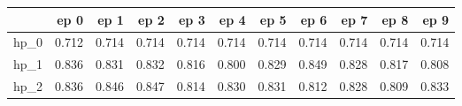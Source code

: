 \begin{tabular}{lrrrrrrrrrr}
\toprule
{} &   ep 0 &   ep 1 &   ep 2 &   ep 3 &   ep 4 &   ep 5 &   ep 6 &   ep 7 &   ep 8 &   ep 9 \\
\midrule
hp\_0 &  0.712 &  0.714 &  0.714 &  0.714 &  0.714 &  0.714 &  0.714 &  0.714 &  0.714 &  0.714 \\
hp\_1 &  0.836 &  0.831 &  0.832 &  0.816 &  0.800 &  0.829 &  0.849 &  0.828 &  0.817 &  0.808 \\
hp\_2 &  0.836 &  0.846 &  0.847 &  0.814 &  0.830 &  0.831 &  0.812 &  0.828 &  0.809 &  0.833 \\
\bottomrule
\end{tabular}
